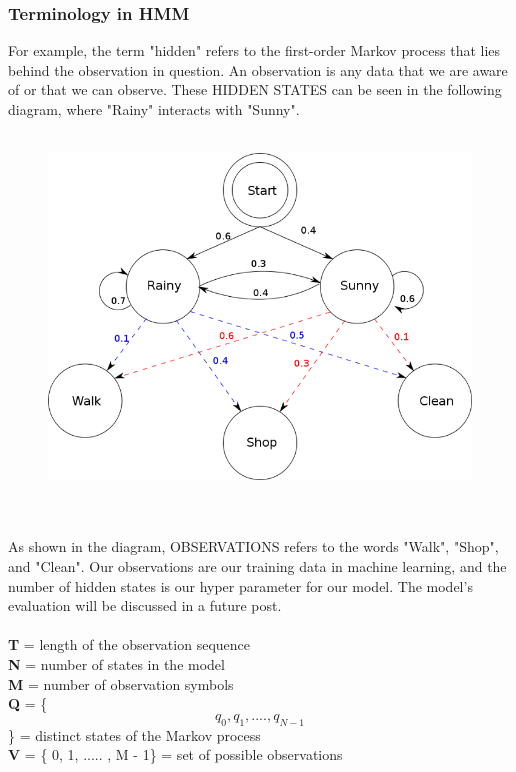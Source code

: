 \documentclass[12pt,letterpaper]{article}
\begin{document}
\subsubsection*{Terminology in HMM}
For example, the term "hidden" refers to the first-order Markov process that lies behind the observation in question. An observation is any data that we are aware of or that we can observe. These HIDDEN STATES can be seen in the following diagram, where "Rainy" interacts with "Sunny".
\\
\\
\begin{figure}[htp]
    \centering
    \includegraphics[width=.95\textwidth]{Hmm.png}
\end{figure}
\\
\\
As shown in the diagram, OBSERVATIONS refers to the words "Walk", "Shop", and "Clean". Our observations are our training data in machine learning, and the number of hidden states is our hyper parameter for our model. The model's evaluation will be discussed in a future post.
\\
\\
\textbf{T} = length of the observation sequence
\\
\textbf{N} = number of states in the model 
\\
\textbf{M} = number of observation symbols
\\
\textbf{Q} = \{ \[q_0,q_1,.... ,q_{N - 1}\] \} = distinct states of the Markov process
\\
\textbf{V} = \{ 0, 1, ..... , M - 1\} = set of possible observations
\\
\end{document}
